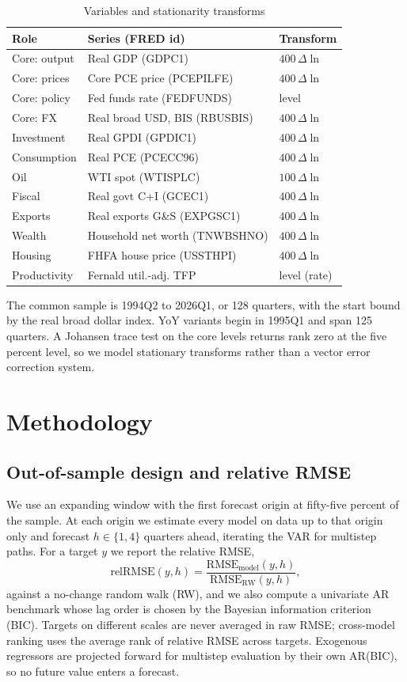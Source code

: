 \documentclass[conference]{IEEEtran}
\begin{document}
\begin{table}[t]
\caption{Variables and stationarity transforms}
\label{tab:data}
\centering
\small
\begin{tabular}{@{}lll@{}}
\toprule
Role & Series (FRED id) & Transform \\
\midrule
Core: output & Real GDP (GDPC1) & $400\,\Delta\ln$ \\
Core: prices & Core PCE price (PCEPILFE) & $400\,\Delta\ln$ \\
Core: policy & Fed funds rate (FEDFUNDS) & level \\
Core: FX & Real broad USD, BIS (RBUSBIS) & $400\,\Delta\ln$ \\
Investment & Real GPDI (GPDIC1) & $400\,\Delta\ln$ \\
Consumption & Real PCE (PCECC96) & $400\,\Delta\ln$ \\
Oil & WTI spot (WTISPLC) & $100\,\Delta\ln$ \\
Fiscal & Real govt C+I (GCEC1) & $400\,\Delta\ln$ \\
Exports & Real exports G\&S (EXPGSC1) & $400\,\Delta\ln$ \\
Wealth & Household net worth (TNWBSHNO) & $400\,\Delta\ln$ \\
Housing & FHFA house price (USSTHPI) & $400\,\Delta\ln$ \\
Productivity & Fernald util.-adj. TFP & level (rate) \\
\bottomrule
\end{tabular}
\end{table}

The common sample is 1994Q2 to 2026Q1, or 128 quarters, with the start bound by the real broad dollar index. YoY variants begin in 1995Q1 and span 125 quarters. A Johansen trace test on the core levels returns rank zero at the five percent level, so we model stationary transforms rather than a vector error correction system.

\section{Methodology}

\subsection{Out-of-sample design and relative RMSE}
We use an expanding window with the first forecast origin at fifty-five percent of the sample. At each origin we estimate every model on data up to that origin only and forecast $h\in\{1,4\}$ quarters ahead, iterating the VAR for multistep paths. For a target $y$ we report the relative RMSE,
\begin{equation}
\mathrm{relRMSE}(y,h) = \frac{\mathrm{RMSE}_{\text{model}}(y,h)}{\mathrm{RMSE}_{\text{RW}}(y,h)},
\end{equation}
against a no-change random walk (RW), and we also compute a univariate AR benchmark whose lag order is chosen by the Bayesian information criterion (BIC). Targets on different scales are never averaged in raw RMSE; cross-model ranking uses the average rank of relative RMSE across targets. Exogenous regressors are projected forward for multistep evaluation by their own AR(BIC), so no future value enters a forecast.
\end{document}
